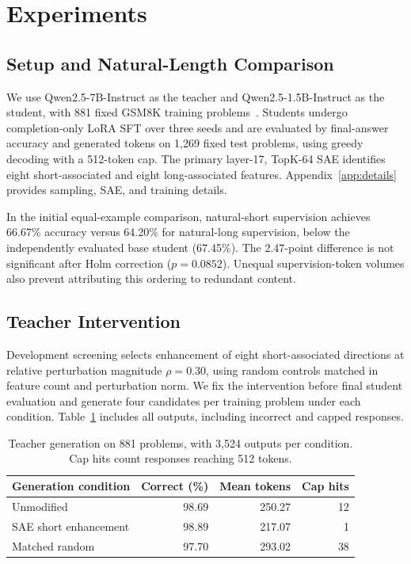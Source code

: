 \section{Experiments}
\label{sec:experiments}

\subsection{Setup and Natural-Length Comparison}
\label{sec:experimental_setup}
\label{sec:natural_length}

We use Qwen2.5-7B-Instruct as the teacher and Qwen2.5-1.5B-Instruct as the student, with 881 fixed GSM8K training problems~\citep{cobbe2021training}.
Students undergo completion-only LoRA SFT over three seeds and are evaluated by final-answer accuracy and generated tokens on 1,269 fixed test problems, using greedy decoding with a 512-token cap.
The primary layer-17, TopK-64 SAE identifies eight short-associated and eight long-associated features.
Appendix~\ref{app:details} provides sampling, SAE, and training details.

In the initial equal-example comparison, natural-short supervision achieves 66.67\% accuracy versus 64.20\% for natural-long supervision, below the independently evaluated base student (67.45\%).
The 2.47-point difference is not significant after Holm correction ($p=0.0852$).
Unequal supervision-token volumes also prevent attributing this ordering to redundant content.

\subsection{Teacher Intervention}
\label{sec:teacher_intervention}

Development screening selects enhancement of eight short-associated directions at relative perturbation magnitude $\rho=0.30$, using random controls matched in feature count and perturbation norm.
We fix the intervention before final student evaluation and generate four candidates per training problem under each condition.
Table~\ref{tab:teacher_generation} includes all outputs, including incorrect and capped responses.

\begin{table}[htbp]
\centering
\small
\begin{tabular}{lrrr}
\toprule
Generation condition & Correct (\%) & Mean tokens & Cap hits \\
\midrule
Unmodified & 98.69 & 250.27 & 12 \\
SAE short enhancement & 98.89 & 217.07 & 1 \\
Matched random & 97.70 & 293.02 & 38 \\
\bottomrule
\end{tabular}
\caption{Teacher generation on 881 problems, with 3,524 outputs per condition. Cap hits count responses reaching 512 tokens.}
\label{tab:teacher_generation}
\end{table}

